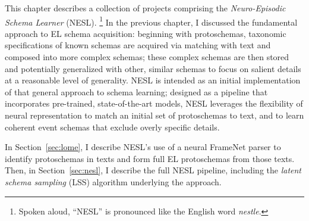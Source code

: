This chapter describes a collection of projects comprising the \textit{Neuro-Episodic Schema Learner} (NESL). \footnote{Spoken aloud, ``NESL'' is pronounced like the English word \textit{nestle}.} In the previous chapter, I discussed the fundamental approach to EL schema acquisition: beginning with protoschemas, taxonomic specifications of known schemas are acquired via matching with text and composed into more complex schemas; these complex schemas are then stored and potentially generalized with other, similar schemas to focus on salient details at a reasonable level of generality. NESL is intended as an initial implementation of that general approach to schema learning; designed as a pipeline that incorporates pre-trained, state-of-the-art models, NESL leverages the flexibility of neural representation to match an initial set of protoschemas to text, and to learn coherent event schemas that exclude overly specific details.

In Section~\ref{sec:lome}, I describe NESL's use of a neural FrameNet parser to identify protoschemas in texts and form full EL protoschemas from those texts. Then, in Section~\ref{sec:nesl}, I describe the full NESL pipeline, including the \textit{latent schema sampling} (LSS) algorithm underlying the approach.
